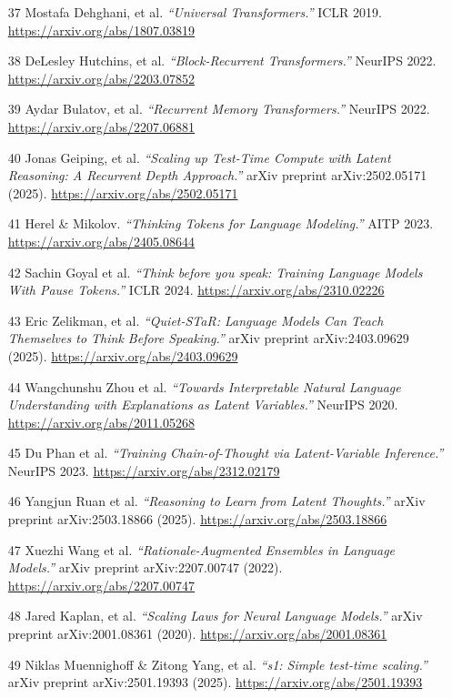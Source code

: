 \documentclass[12pt]{article}
\begin{document}
\begin{itemize}
    \item [37] Mostafa Dehghani, et al. \textit{``Universal Transformers.''} ICLR 2019. \url{https://arxiv.org/abs/1807.03819}
    \item [38] DeLesley Hutchins, et al. \textit{``Block-Recurrent Transformers.''} NeurIPS 2022. \url{https://arxiv.org/abs/2203.07852}
    \item [39] Aydar Bulatov, et al. \textit{``Recurrent Memory Transformers.''} NeurIPS 2022. \url{https://arxiv.org/abs/2207.06881}
    \item [40] Jonas Geiping, et al. \textit{``Scaling up Test-Time Compute with Latent Reasoning: A Recurrent Depth Approach.''} arXiv preprint arXiv:2502.05171 (2025). \url{https://arxiv.org/abs/2502.05171}
    \item [41] Herel \& Mikolov. \textit{``Thinking Tokens for Language Modeling.''} AITP 2023. \url{https://arxiv.org/abs/2405.08644}
    \item [42] Sachin Goyal et al. \textit{``Think before you speak: Training Language Models With Pause Tokens.''} ICLR 2024. \url{https://arxiv.org/abs/2310.02226}
    \item [43] Eric Zelikman, et al. \textit{``Quiet-STaR: Language Models Can Teach Themselves to Think Before Speaking.''} arXiv preprint arXiv:2403.09629 (2025). \url{https://arxiv.org/abs/2403.09629}
    \item [44] Wangchunshu Zhou et al. \textit{``Towards Interpretable Natural Language Understanding with Explanations as Latent Variables.''} NeurIPS 2020. \url{https://arxiv.org/abs/2011.05268}
    \item [45] Du Phan et al. \textit{``Training Chain-of-Thought via Latent-Variable Inference.''} NeurIPS 2023. \url{https://arxiv.org/abs/2312.02179}
    \item [46] Yangjun Ruan et al. \textit{``Reasoning to Learn from Latent Thoughts.''} arXiv preprint arXiv:2503.18866 (2025). \url{https://arxiv.org/abs/2503.18866}
    \item [47] Xuezhi Wang et al. \textit{``Rationale-Augmented Ensembles in Language Models.''} arXiv preprint arXiv:2207.00747 (2022). \url{https://arxiv.org/abs/2207.00747}
    \item [48] Jared Kaplan, et al. \textit{``Scaling Laws for Neural Language Models.''} arXiv preprint arXiv:2001.08361 (2020). \url{https://arxiv.org/abs/2001.08361}
    \item [49] Niklas Muennighoff \& Zitong Yang, et al. \textit{``s1: Simple test-time scaling.''} arXiv preprint arXiv:2501.19393 (2025). \url{https://arxiv.org/abs/2501.19393}

\end{itemize}
\end{document}

